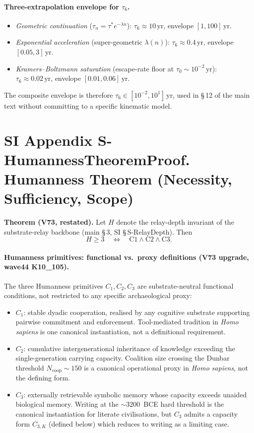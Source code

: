 \documentclass[11pt]{article}
\begin{document}
\paragraph{Three-extrapolation envelope for $\tau_6$.}
\begin{itemize}\setlength\itemsep{0.1em}
  \item \emph{Geometric continuation} ($\tau_n=\tau^{*}e^{-\lambda n}$): $\tau_6\!\approx\!10\,\mathrm{yr}$, envelope $[1,100]\,\mathrm{yr}$.
  \item \emph{Exponential acceleration} (super-geometric $\lambda(n)$): $\tau_6\!\approx\!0.4\,\mathrm{yr}$, envelope $[0.05,3]\,\mathrm{yr}$.
  \item \emph{Kramers--Boltzmann saturation} (escape-rate floor at $\tau_{0}\!\sim\!10^{-2}\,\mathrm{yr}$): $\tau_6\!\approx\!0.02\,\mathrm{yr}$, envelope $[0.01,0.06]\,\mathrm{yr}$.
\end{itemize}
The composite envelope is therefore $\tau_6\in[10^{-2},10^{1}]\,\mathrm{yr}$, used in \S\,12 of the main text without committing to a specific kinematic model.

\section*{SI Appendix S-HumannessTheoremProof. Humanness Theorem (Necessity, Sufficiency, Scope)}
\label{sec:S-HumannessTheoremProof}

\textbf{Theorem (V73, restated).} Let $H$ denote the relay-depth invariant of the substrate-relay backbone (main \S\,3, SI \S\,S-RelayDepth). Then
\[
  H\geq 3 \quad\Longleftrightarrow\quad \mathrm{C1}\wedge\mathrm{C2}\wedge\mathrm{C3}.
\]

\paragraph{Humanness primitives: functional vs.\ proxy definitions (V73 upgrade, wave44 K10\_105).} The three Humanness primitives $C_1, C_2, C_3$ are substrate-neutral functional conditions, not restricted to any specific archaeological proxy:
\begin{itemize}\setlength\itemsep{0.1em}
  \item $C_1$: stable dyadic cooperation, realised by any cognitive substrate supporting pairwise commitment and enforcement. Tool-mediated tradition in \emph{Homo sapiens} is one canonical instantiation, not a definitional requirement.
  \item $C_2$: cumulative intergenerational inheritance of knowledge exceeding the single-generation carrying capacity. Coalition size crossing the Dunbar threshold $N_{\mathrm{coop}}\!\sim\!150$ is a canonical operational proxy in \emph{Homo sapiens}, not the defining form.
  \item $C_3$: externally retrievable symbolic memory whose capacity exceeds unaided biological memory. Writing at the $\sim\!3200$~BCE hard threshold is the canonical instantiation for literate civilisations, but $C_3$ admits a capacity form $C_{3,K}$ (defined below) which reduces to writing as a limiting case.
\end{itemize}
\end{document}
